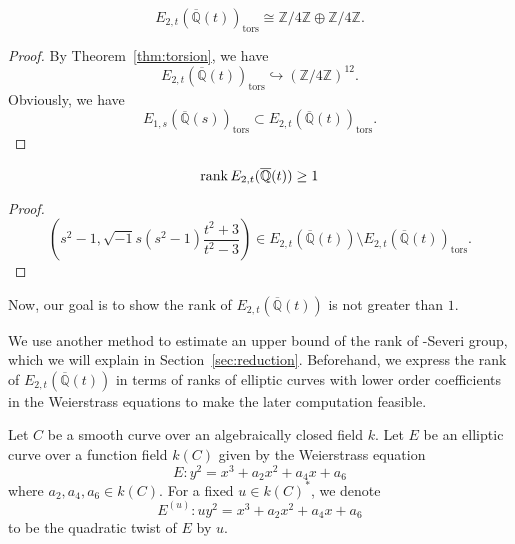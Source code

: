 \documentclass[main]{subfiles}
\begin{document}
\begin{lem}
    \begin{equation*}
        E_{2,t}(\overline{\mathbb{Q}}(t))_{\text{tors}} \cong \mathbb{Z} / 4 \mathbb{Z} \oplus \mathbb{Z} / 4 \mathbb{Z}.
    \end{equation*}
\end{lem}
\begin{proof}
    By Theorem~\ref{thm:torsion}, we have
    \begin{equation*}
        E_{2,t}(\overline{\mathbb{Q}}(t))_{\text{tors}} \hookrightarrow (\mathbb{Z} / 4 \mathbb{Z})^{12}.
    \end{equation*}
    Obviously, we have
    \begin{equation*}
        E_{1,s}(\overline{\mathbb{Q}}(s))_{\text{tors}} \subset E_{2,t}(\overline{\mathbb{Q}}(t))_{\text{tors}}.
    \end{equation*}
\end{proof}

\begin{lem}
    \begin{equation*}
        \operatorname{rank} E_{2,t}(\overline{\mathbb{Q}}(t)) \geq 1
    \end{equation*}
\end{lem}
\begin{proof}
    \begin{equation*}
        \left(s^{2} - 1, \sqrt{-1} s(s^{2} - 1) \frac{t^{2} + 3}{t^{2} - 3} \right) \in E_{2,t}(\overline{\mathbb{Q}}(t)) \setminus E_{2,t}(\overline{\mathbb{Q}}(t))_{\text{tors}}.
    \end{equation*}
\end{proof}
Now, our goal is to show the rank of $E_{2,t}(\overline{\mathbb{Q}}(t))$ is not greater than $1$.

We use another method to estimate an upper bound of the rank of \Neron-Severi group, which we will explain in Section~\ref{sec:reduction}.
Beforehand, we express the rank of $E_{2,t}(\overline{\mathbb{Q}}(t))$ in terms of ranks of elliptic curves with lower order coefficients in the Weierstrass equations to make the later computation feasible.

\begin{dfn}
    Let $C$ be a smooth curve over an algebraically closed field $k$.
    Let $E$ be an elliptic curve over a function field $k(C)$ given by the Weierstrass equation
    \begin{equation*}
        E: y^{2} = x^{3} + a_{2} x^{2} + a_{4} x + a_{6}
    \end{equation*}
    where $a_{2}, a_{4}, a_{6} \in k(C)$.
    For a fixed $u \in k(C)^*$, we denote
    \begin{equation*}
        E^{(u)}: u y^{2} = x^{3} + a_{2} x^{2} + a_{4} x + a_{6}
    \end{equation*}
    to be the quadratic twist of $E$ by $u$.
\end{dfn}
\end{document}
